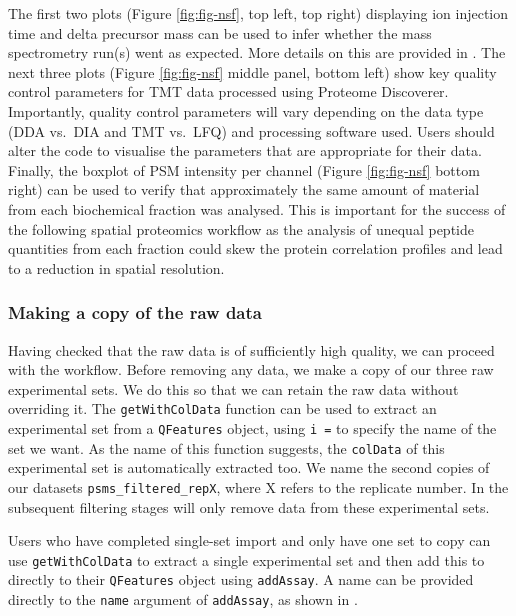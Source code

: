 \documentclass[9pt,a4paper,]{extarticle}
\begin{document}
The first two plots (Figure \ref{fig:fig-nsf}, top left, top right) displaying
ion injection time and delta precursor mass can be used to infer whether the
mass spectrometry run(s) went as expected. More details on this are provided in
\citet{Hutchings2023}. The next three plots (Figure \ref{fig:fig-nsf} middle panel,
bottom left) show key quality control parameters for TMT data processed using
Proteome Discoverer. Importantly, quality control parameters will vary depending
on the data type (DDA vs.~DIA and TMT vs.~LFQ) and processing software used.
Users should alter the code to visualise the parameters that are appropriate for
their data. Finally, the boxplot of PSM intensity per channel (Figure
\ref{fig:fig-nsf} bottom right) can be used to verify that approximately the
same amount of material from each biochemical fraction was analysed. This is
important for the success of the following spatial proteomics workflow as the
analysis of unequal peptide quantities from each fraction could skew the protein
correlation profiles and lead to a reduction in spatial resolution.

\subsubsection{Making a copy of the raw data}\label{making-a-copy-of-the-raw-data}

Having checked that the raw data is of sufficiently high quality, we can proceed
with the workflow. Before removing any data, we make a copy of our three raw
experimental sets. We do this so that we can retain the raw data without
overriding it. The \texttt{getWithColData} function can be used to extract an
experimental set from a \texttt{QFeatures} object, using \texttt{i\ =} to specify the name
of the set we want. As the name of this function suggests, the \texttt{colData} of this
experimental set is automatically extracted too. We name the second copies of
our datasets \texttt{psms\_filtered\_repX}, where X refers to the replicate number. In
the subsequent filtering stages will only remove data from these experimental sets.

Users who have completed single-set import and only have one set to copy can
use \texttt{getWithColData} to extract a single experimental set and then add this to
directly to their \texttt{QFeatures} object using \texttt{addAssay}. A name can be provided
directly to the \texttt{name} argument of \texttt{addAssay}, as shown in \citet{Hutchings2023}.
\end{document}
